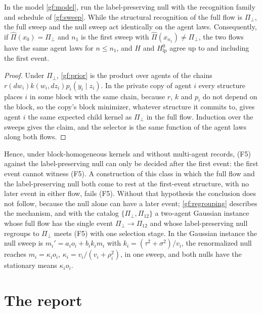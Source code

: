 In the model \cref{gf:model}, run the label-preserving null with the
recognition family and schedule of \cref{gf:sweep}. While the structural
recognition of the full flow is $\Pi_\perp$, the full sweep and the null
sweep act identically on the agent laws. Consequently, if
$\hat\Pi(x_0)=\Pi_\perp$ and $n_1$ is the first sweep with
$\hat\Pi(x_{n_1})\neq\Pi_\perp$, the two flows have the same agent laws for
$n\leq n_1$, and $H$ and $H^0_{\mathrm{lp}}$ agree up to and including the
first event.
\begin{proof}
Under $\Pi_\perp$, \cref{gf:prior} is the product over agents of the chains
$r(dw_i)k(w_i,dz_i)p_i(y_i\mid z_i)$. In the private copy of agent $i$ every
structure places $i$ in some block with the same chain, because $r$, $k$ and
$p_i$ do not depend on the block, so the copy's block minimizer, whatever
structure it commits to, gives agent $i$ the same expected child kernel as
$\Pi_\perp$ in the full flow. Induction over the sweeps gives the claim, and
the selector is the same function of the agent laws along both flows.
\end{proof}

Hence, under block-homogeneous kernels and without multi-agent records, (F5)
against the label-preserving null can only be decided after the first event:
the first event cannot witness (F5). A construction of this class in which the
full flow and the label-preserving null both come to rest at the first-event
structure, with no later event in either flow, fails (F5). Without that
hypothesis the conclusion does not follow, because the null alone can have a
later event; \cref{gf:regrouping} describes the mechanism, and with the catalog
$\{\Pi_\perp,\Pi_{12}\}$ a two-agent Gaussian instance whose full flow has the
single event $\Pi_\perp\to\Pi_{12}$ and whose label-preserving null regroups
to $\Pi_\perp$ meets (F5) with one selection stage. In the
Gaussian instance the null sweep is $m_i'=a_io_i+b_ik_im_i$ with
$k_i=(\tau^2+\sigma^2)/v_i$, the renormalized null reaches
$m_i=\kappa_io_i$, $\kappa_i=v_i/(v_i+\rho_i^2)$, in one sweep, and both nulls
have the stationary means $\kappa_io_i$.

\section{The report}
\label{gf:sec-report}


